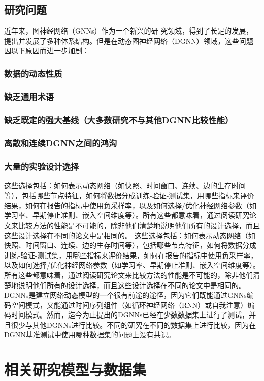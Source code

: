 \documentclass[conference]{IEEEtran}
\begin{document}
\subsection{研究问题}

近年来，图神经网络（GNNs）作为一个新兴的研 究领域，得到了长足的发展，提出并发展了多种体系结构。但是在动态图神经网络（DGNN）领域，这些问题因以下原因而进一步加剧：

\subsubsection{数据的动态性质}
\subsubsection{缺乏通用术语}
\subsubsection{缺乏既定的强大基线（大多数研究不与其他DGNN比较性能）}
\subsubsection{离散和连续DGNN之间的鸿沟}
\subsubsection{大量的实验设计选择}
这些选择包括：如何表示动态网络（如快照、时间窗口、连续、边的生存时间等），包括哪些节点特征，如何将数据分成训练-验证-测试集，用哪些指标来评价结果，如何在报告的指标中使用负采样率，以及如何选择/优化神经网络参数（如学习率、早期停止准则、嵌入空间维度等）。所有这些都意味着，通过阅读研究论文来比较方法的性能是不可能的，除非他们清楚地说明他们所有的设计选择，而且这些设计选择在不同的论文中是相同的。
这些选择包括：如何表示动态网络（如快照、时间窗口、连续、边的生存时间等），包括哪些节点特征，如何将数据分成训练-验证-测试集，用哪些指标来评价结果，如何在报告的指标中使用负采样率，以及如何选择/优化神经网络参数（如学习率、早期停止准则、嵌入空间维度等）。所有这些都意味着，通过阅读研究论文来比较方法的性能是不可能的，除非他们清楚地说明他们所有的设计选择，而且这些设计选择在不同的论文中是相同的。
DGNNs是建立网络动态模型的一个很有前途的途径，因为它们既能通过GNNs编码空间模式，又能通过时间序列组件（如循环神经网络（RNN）或自我注意）编码时间模式。然而，迄今为止提出的DGNNs已经在少数数据集上进行了测试，并且很少与其他DGNNs进行比较。不同的研究在不同的数据集上进行比较，因为在DGNN基准测试中使用哪种数据集的问题上没有共识。

\section{相关研究模型与数据集}
\end{document}
